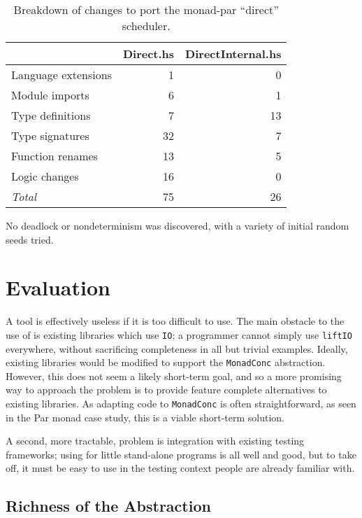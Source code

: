 \begin{table}
  \centering
  \begin{tabular}{l|rr} \toprule
    & Direct.hs & DirectInternal.hs \\ \midrule
    Language extensions & 1 & 0 \\
    Module imports & 6 & 1 \\
    Type definitions & 7 & 13 \\
    Type signatures & 32 & 7 \\
    Function renames & 13 & 5 \\
    Logic changes & 16 & 0 \\ \midrule
    \emph{Total} & 75 & 26 \\ \bottomrule
  \end{tabular}
  \caption{Breakdown of changes to port the monad-par ``direct'' scheduler.}\label{tbl:example-parmonad-diff}
\end{table}

No deadlock or nondeterminism was discovered, with a variety of
initial random seeds tried.

\section{Evaluation}
\label{sec:dejafu-evaluation}

A tool is effectively useless if it is too difficult to use.  The main
obstacle to the use of \dejafu{} is existing libraries which use
\verb|IO|; a programmer cannot simply use \verb|liftIO| everywhere,
without sacrificing completeness in all but trivial examples.
Ideally, existing libraries would be modified to support the
\verb|MonadConc| abstraction.  However, this does not seem a likely
short-term goal, and so a more promising way to approach the problem
is to provide feature complete alternatives to existing libraries.  As
adapting code to \verb|MonadConc| is often straightforward, as seen in
the Par monad case study, this is a viable short-term solution.

A second, more tractable, problem is integration with existing testing
frameworks; using \dejafu{} for little stand-alone programs is all
well and good, but to take off, it must be easy to use in the testing
context people are already familiar with.


\subsection{Richness of the Abstraction}


